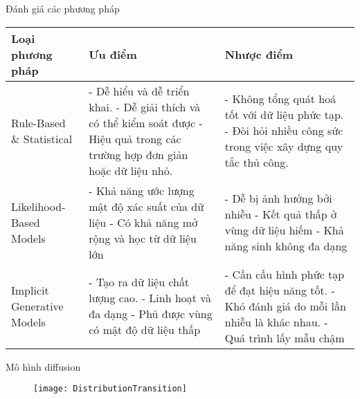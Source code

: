 \begin{frame}{Đánh giá các phương pháp}
	
	\begin{table}[h!]
		\footnotesize
		\centering
		\renewcommand{\arraystretch}{1.5} %
		\begin{tabular}{|p{}|p{}|p{}|}
			\hline
			\textbf{Loại phương pháp} & \textbf{Ưu điểm} & \textbf{Nhược điểm} \\ \hline
			Rule-Based \& Statistical & 
			- Dễ hiểu và dễ triển khai. \newline 
			- Dễ giải thích và có thể kiểm soát được \newline
			- Hiệu quả trong các trường hợp đơn giản hoặc dữ liệu nhỏ. & 
			- Không tổng quát hoá tốt với dữ liệu phức tạp. \newline 
			- Đòi hỏi nhiều công sức trong việc xây dựng quy tắc thủ công. \\ \hline
			Likelihood-Based Models & 
			- Khả năng ước lượng mật độ xác suất của dữ liệu \newline 
			- Có khả năng mở rộng và học từ dữ liệu lớn & 
			- Dễ bị ảnh hưởng bởi nhiễu \newline 
			- Kết quả thấp ở vùng dữ liệu hiếm \newline
			- Khả năng sinh không đa dạng \\ \hline
			Implicit Generative Models & 
			- Tạo ra dữ liệu chất lượng cao. \newline 
			- Linh hoạt và đa dạng \newline
			- Phủ được vùng có mật độ dữ liệu thấp & 
			- Cần cấu hình phức tạp để đạt hiệu năng tốt. \newline 
			- Khó đánh giá do mỗi lần nhiễu là khác nhau. \newline 
			- Quá trình lấy mẫu chậm \\ \hline
		\end{tabular}
	\end{table}
	
\end{frame}

\begin{frame}{Mô hình diffusion}
	\begin{figure}
		\texttt{[image: DistributionTransition]}
	\end{figure}	
\end{frame}

